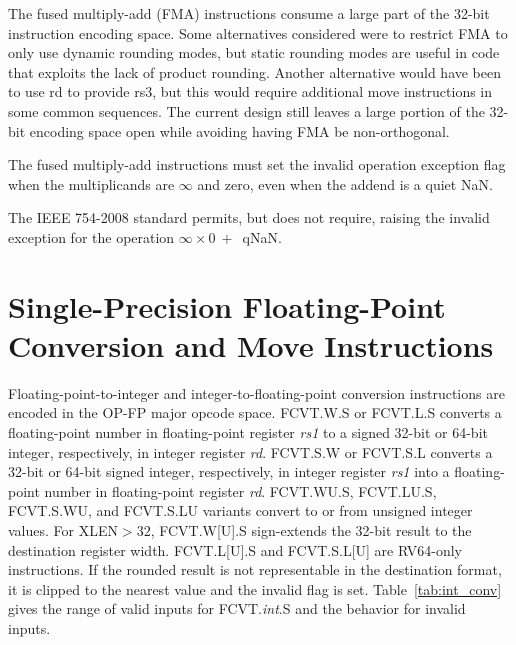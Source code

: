 \begin{commentary}
 The fused multiply-add (FMA) instructions consume a large part of the
 32-bit instruction encoding space.  Some alternatives considered were
 to restrict FMA to only use dynamic rounding modes, but static
 rounding modes are useful in code that exploits the lack of product
 rounding.  Another alternative would have been to use rd to provide
 rs3, but this would require additional move instructions in some
 common sequences.  The current design still leaves a large portion of
 the 32-bit encoding space open while avoiding having FMA be
 non-orthogonal.
\end{commentary}

The fused multiply-add instructions must set the invalid operation exception flag
when the multiplicands are $\infty$ and zero, even when the addend is a quiet
NaN.
\begin{commentary}
The IEEE 754-2008 standard permits, but does not require, raising the
invalid exception for the operation \mbox{$\infty\times 0\ +$ qNaN}.
\end{commentary}

\section{Single-Precision Floating-Point Conversion and Move \mbox{Instructions}}

Floating-point-to-integer and integer-to-floating-point conversion
instructions are encoded in the OP-FP major opcode space.
FCVT.W.S or FCVT.L.S converts a floating-point number
in floating-point register {\em rs1} to a signed 32-bit or 64-bit
integer, respectively, in integer register {\em rd}.  FCVT.S.W
or FCVT.S.L converts a 32-bit or 64-bit signed integer,
respectively, in integer register {\em rs1} into a floating-point
number in floating-point register {\em rd}. FCVT.WU.S,
FCVT.LU.S, FCVT.S.WU, and FCVT.S.LU variants
convert to or from unsigned integer values.
For XLEN$>32$, FCVT.W[U].S sign-extends the 32-bit result to the
destination register width.
FCVT.L[U].S and FCVT.S.L[U] are RV64-only instructions.
If the rounded result is not representable in the destination format,
it is clipped to the nearest value and the invalid flag is set.
Table~\ref{tab:int_conv} gives the range of valid inputs for FCVT.{\em int}.S
and the behavior for invalid inputs.

